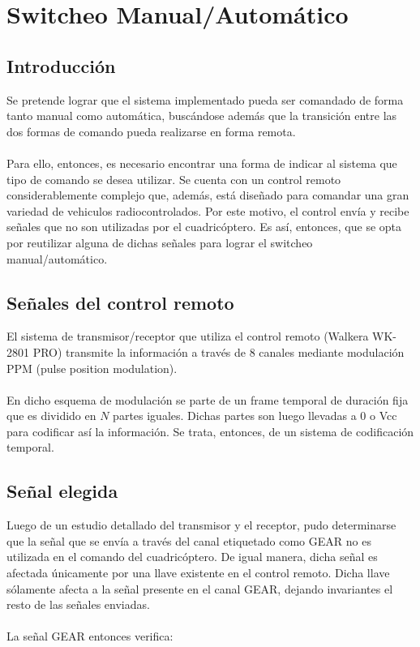 \documentclass[main]{subfiles}
\begin{document}
\chapter{Switcheo Manual/Automático}
\label{chap:anexo_switcheo}
\section{Introducción}

Se pretende lograr que el sistema implementado pueda ser comandado de forma tanto manual como automática, buscándose además que la transición entre las dos formas de comando pueda realizarse en forma remota.\\
\\
Para ello, entonces, es necesario encontrar una forma de indicar al sistema que tipo de comando se desea utilizar. Se cuenta con un control remoto considerablemente complejo que, además, está diseñado para comandar una gran variedad de vehiculos radiocontrolados. Por este motivo, el control envía y recibe señales que no son utilizadas por el cuadricóptero. Es así, entonces, que se opta por reutilizar alguna de dichas señales para lograr el switcheo manual/automático.

\section{Señales del control remoto}

El sistema de transmisor/receptor que utiliza el control remoto (Walkera WK-2801 PRO) transmite la información a través de 8 canales mediante modulación PPM (pulse position modulation).\\
\\
En dicho esquema de modulación se parte de un frame temporal de duración fija que es dividido en $N$ partes iguales. Dichas partes son luego llevadas a 0 o Vcc para codificar así la información. Se trata, entonces, de un sistema de codificación temporal.\\

\section{Señal elegida}
Luego de un estudio detallado del transmisor y el receptor, pudo determinarse que la señal que se envía a través del canal etiquetado como GEAR no es utilizada en el comando del cuadricóptero. De igual manera, dicha señal es afectada únicamente por una llave existente en el control remoto. Dicha llave sólamente afecta a la señal presente en el canal GEAR, dejando invariantes el resto de las señales enviadas.\\
\\
La señal GEAR entonces verifica:
\end{document}
